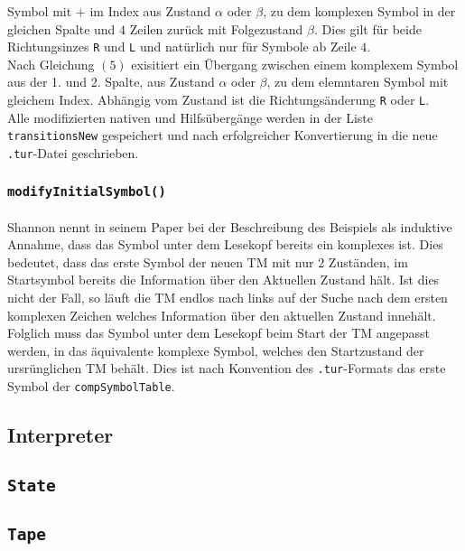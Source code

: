 \documentclass[10pt, a4paper]{article}
\newcommand{\ilc}{\texttt}
\begin{document}
Symbol mit $+$ im Index aus Zustand $\alpha$ oder $\beta$, zu dem komplexen
Symbol in der gleichen Spalte und $4$ Zeilen zurück mit Folgezustand $\beta$.
Dies gilt für beide Richtungsinzes \ilc{R} und \ilc{L} und natürlich nur für Symbole
ab Zeile $4$.\\
Nach Gleichung $(5)$ exisitiert ein Übergang zwischen einem komplexem
Symbol aus der 1. und 2. Spalte, aus Zustand $\alpha$ oder $\beta$, zu dem
elemntaren Symbol mit gleichem Index. Abhängig vom Zustand ist die
Richtungsänderung \ilc{R} oder \ilc{L}.\\
Alle modifizierten nativen und Hilfsübergänge werden in der Liste \ilc{transitionsNew} gespeichert und nach erfolgreicher Konvertierung in die neue \ilc{.tur}-Datei geschrieben.\par

\subsubsection*{\ilc{modifyInitialSymbol()}}
\paragraph*{}
Shannon nennt in seinem Paper bei der Beschreibung des Beispiels als induktive Annahme, dass das Symbol unter dem Lesekopf bereits ein komplexes ist. Dies bedeutet, dass das erste Symbol der neuen TM mit nur 2 Zuständen, im Startsymbol bereits die Information über den Aktuellen Zustand hält. Ist dies nicht der Fall, so läuft die TM endlos nach links auf der Suche nach dem ersten komplexen Zeichen welches Information über den aktuellen Zustand innehält.\\
Folglich muss das Symbol unter dem Lesekopf beim Start der TM angepasst werden, in das äquivalente komplexe Symbol, welches den Startzustand der ursrünglichen TM behält. Dies ist nach Konvention des \ilc{.tur}-Formats das erste Symbol der \ilc{compSymbolTable}.\par

\subsection*{Interpreter}
\subsection*{\ilc{State}}
\subsection*{\ilc{Tape}}
\end{document}
